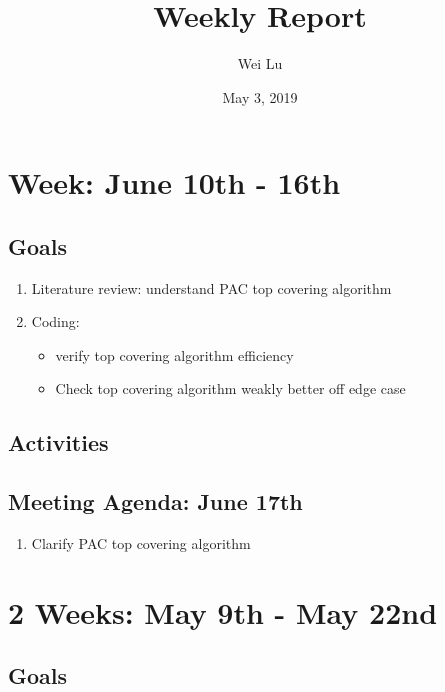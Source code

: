 \documentclass[a4paper]{article}
\title{Weekly Report}
\date{May 3, 2019}
\author{Wei Lu}
\begin{document}
\maketitle

\section*{Week: June 10th - 16th}

\subsection*{Goals}

\begin{enumerate}
  \item Literature review: understand PAC top covering algorithm
  \item Coding:
  \begin{itemize}
    \item verify top covering algorithm efficiency
    \item Check top covering algorithm weakly better off edge case
  \end{itemize}
\end{enumerate}

\subsection*{Activities}

\begin{enumerate}
\end{enumerate}

\subsection*{Meeting Agenda: June 17th}

\begin{enumerate}
  \item Clarify PAC top covering algorithm
\end{enumerate}

\section*{2 Weeks: May 9th - May 22nd}

\subsection*{Goals}
\end{document}
